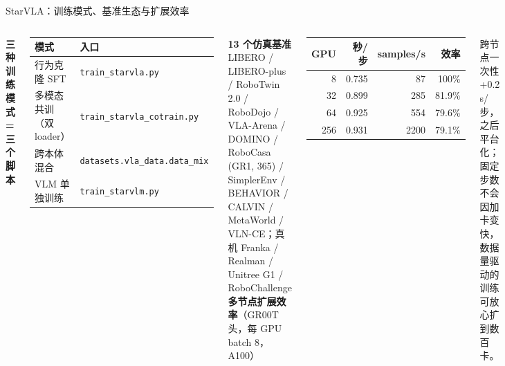 \documentclass[aspectratio=169,10pt]{beamer}
\begin{document}
\begin{frame}{StarVLA：训练模式、基准生态与扩展效率}
  \begin{columns}[T]
    \textbf{三种训练模式 = 三个脚本}
    \begin{center}\footnotesize
    \begin{tabular}{p{3.0cm}p{3.9cm}}
      \toprule
      模式 & 入口 \\
      \midrule
      行为克隆 SFT & \texttt{train\_starvla.py} \\
      多模态共训（双 loader） & \texttt{train\_starvla\_cotrain.py} \\
      跨本体混合 & \texttt{datasets.vla\_data.data\_mix} \\
      VLM 单独训练 & \texttt{train\_starvlm.py} \\
      \bottomrule
    \end{tabular}
    \end{center}
    \vspace{4pt}
    \textbf{13 个仿真基准} LIBERO / LIBERO-plus / RoboTwin 2.0 / RoboDojo / VLA-Arena / DOMINO / RoboCasa (GR1, 365) / SimplerEnv / BEHAVIOR / CALVIN / MetaWorld / VLN-CE；真机 Franka / Realman / Unitree G1 / RoboChallenge
    \textbf{多节点扩展效率}（GR00T 头，每 GPU batch 8，A100）
    \begin{center}\footnotesize
    \begin{tabular}{rrrr}
      \toprule
      GPU & 秒/步 & samples/s & 效率 \\
      \midrule
      8 & 0.735 & 87 & 100\% \\
      32 & 0.899 & 285 & 81.9\% \\
      64 & 0.925 & 554 & 79.6\% \\
      256 & 0.931 & 2200 & 79.1\% \\
      \bottomrule
    \end{tabular}
    \end{center}
    \vspace{2pt}
    \footnotesize 跨节点一次性 +0.2 s/步，之后平台化；固定步数不会因加卡变快，数据量驱动的训练可放心扩到数百卡。
  \end{columns}
\end{frame}

\end{document}
